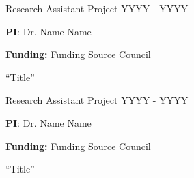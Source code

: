 

\begin{cventries}

  \cventry
    {Research Assistant} %
    {Project} %
    {} %
    {YYYY - YYYY} %
    {
      \begin{cvitems} %
              \item {\textbf{PI}: Dr. Name Name} %
                \item {\textbf{Funding: }Funding Source Council} %
                \item {“Title”} %
      \end{cvitems}
    }

  \cventry
    {Research Assistant} %
    {Project} %
    {} %
    {YYYY - YYYY} %
    {
      \begin{cvitems} %
              \item {\textbf{PI}: Dr. Name Name} %
                \item {\textbf{Funding: }Funding Source Council} %
                \item {“Title”} %
      \end{cvitems}
    }

\end{cventries}







